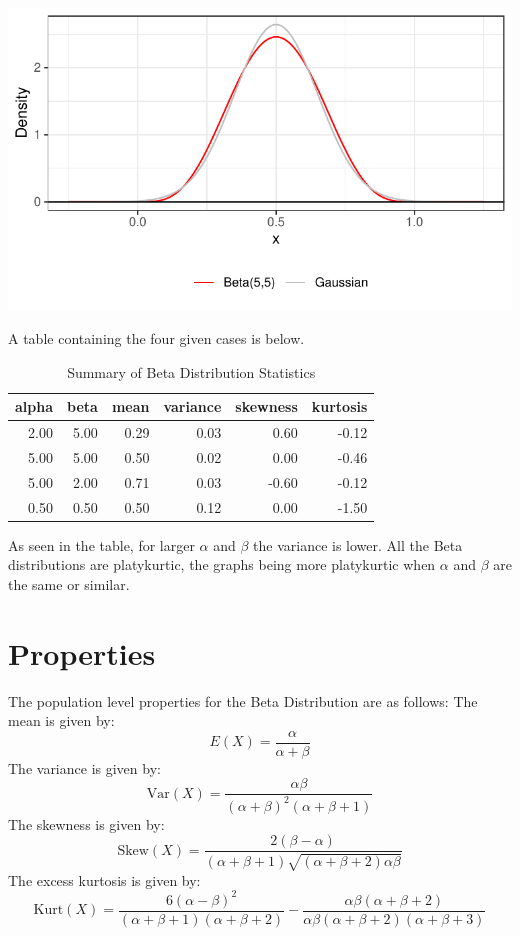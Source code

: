 \documentclass{article}\usepackage[]{graphicx}\usepackage[]{xcolor}
\makeatletter
\def\maxwidth{ %
  \ifdim\Gin@nat@width>\linewidth
    \linewidth
  \else
    \Gin@nat@width
  \fi
}
\newenvironment{knitrout}{}{} %
\makeatother
\begin{document}
\begin{multicols}{2}
\begin{knitrout}
\color{fgcolor}
\includegraphics[width=\maxwidth]{figure/unnamed-chunk-1-1} 
\end{knitrout}

A table containing the four given cases is below.


\begin{table}[H]
\centering
\begingroup\small
\begin{tabular}{rrrrrr}
  \hline
alpha & beta & mean & variance & skewness & kurtosis \\ 
  \hline
2.00 & 5.00 & 0.29 & 0.03 & 0.60 & -0.12 \\ 
  5.00 & 5.00 & 0.50 & 0.02 & 0.00 & -0.46 \\ 
  5.00 & 2.00 & 0.71 & 0.03 & -0.60 & -0.12 \\ 
  0.50 & 0.50 & 0.50 & 0.12 & 0.00 & -1.50 \\ 
   \hline
\end{tabular}
\endgroup
\caption{Summary of Beta Distribution Statistics} 
\end{table}

As seen in the table, for larger \(\alpha\) and \(\beta\) the variance is lower. All the Beta distributions are platykurtic, the graphs being more platykurtic when \(\alpha\) and \(\beta\) are the same or similar. 

\section{Properties}
The population level properties for the Beta Distribution are as follows:
The mean is given by:
\[
E(X) = \frac{\alpha}{\alpha + \beta}
\]
The variance is given by:
\[
\text{Var}(X) = \frac{\alpha \beta}{(\alpha + \beta)^2 (\alpha + \beta + 1)}
\]
The skewness is given by:
\[
\text{Skew}(X) = \frac{2(\beta - \alpha)}{(\alpha + \beta + 1)\sqrt{(\alpha + \beta + 2)\alpha \beta}}
\]
The excess kurtosis is given by:
\[
\text{Kurt}(X) = \frac{6(\alpha - \beta)^2}{(\alpha + \beta + 1)\left(\alpha + \beta + 2\right)} - \frac{\alpha \beta (\alpha + \beta + 2)}{\alpha \beta (\alpha + \beta + 2)(\alpha + \beta + 3)}
\]


\end{multicols}
\end{document}
